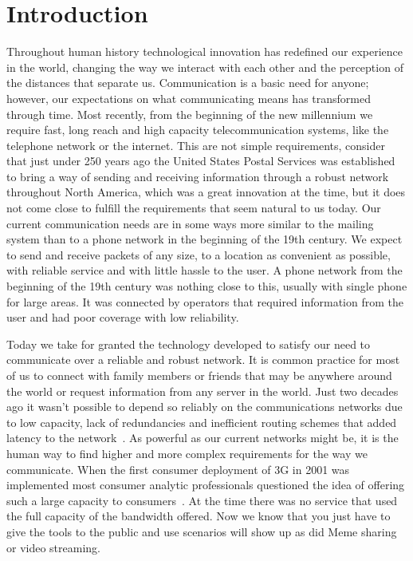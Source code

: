 \setcounter{equation}{0}
\chapter{Introduction}
  Throughout human history technological innovation has redefined our experience in the world, changing the way we interact with each other and the perception of the distances that separate us. Communication is a basic need for anyone; however, our expectations on what communicating means has transformed through time. Most recently, from the beginning of the new millennium we require fast, long reach and high capacity telecommunication systems, like  the telephone network or the internet. This are not simple requirements, consider that just under 250 years ago the United States Postal Services was established to bring a way of sending and receiving information through a robust network throughout North America, which was a great innovation at the time, but it does not come close to fulfill the requirements that seem natural to us today. Our current communication needs are in some ways more similar to the mailing system than to a phone network in the beginning of the 19th century. We expect to send and receive packets of any size, to a location as convenient as possible, with reliable service and with little hassle to the user. A phone network from the beginning of the 19th century was nothing close to this, usually with single phone for large areas. It was connected by operators that required information from the user and had poor coverage with low reliability.

Today we take for granted the technology developed to satisfy our need to communicate over a reliable and robust network.  It is common practice for most of us to connect with family members or friends that may be anywhere around the world or request information from any server in the world. Just two decades ago it wasn't possible to depend so reliably on the communications networks due to low capacity, lack of redundancies and inefficient routing schemes that added latency to the network~\cite{HistoryCommunication}. As powerful as our current networks might be, it is the human way to find higher and more complex requirements for the way we communicate. When the first consumer deployment of 3G in 2001 was implemented most consumer analytic professionals questioned the idea of offering such a large capacity to consumers~\cite{HistoryCommunication}. At the time there was no service that used the full capacity of the bandwidth offered. Now we know that you just have to give the tools to the public and use scenarios will show up as did Meme sharing or video streaming. 
        


